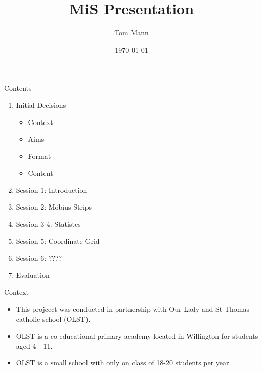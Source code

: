 \documentclass{beamer}  %
\title{MiS Presentation}
\author{Tom Mann}
\date{\today}
\begin{document}
\begin{frame}
    \titlepage
\end{frame}

\begin{frame}{Contents}
    
    
    \begin{enumerate}
        \item Initial Decisions
        \begin{itemize}
            \item Context
            \item Aims
            \item Format
            \item Content
        \end{itemize}
        \item Session 1: Introduction
        \item Session 2: M\"{o}bius Strips
        \item Session 3-4: Statistcs
        \item Session 5: Coordinate Grid
        \item Session 6: ????
        \item Evaluation
    \end{enumerate}
\end{frame}

\begin{frame}{Context}
    \begin{itemize}
        \item This projcect was conducted in partnership with Our Lady and St Thomas catholic school (OLST).
        \item OLST is a co-educational primary academy located in Willington for students aged 4 - 11. 
        \item OLST is a small school with only on class of 18-20 students per year.
    \end{itemize}
\end{frame}
\end{document}
